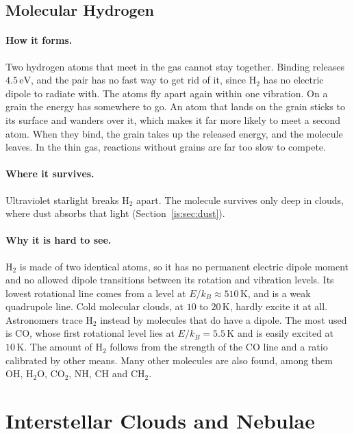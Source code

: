 \subsection{Molecular Hydrogen}
\label{is:sec:h2}

\paragraph{How it forms.} Two hydrogen atoms that meet in the gas cannot stay together. Binding releases $4.5\,\mathrm{eV}$, and the pair has no fast way to get rid of it, since $\mathrm{H_2}$ has no electric dipole to radiate with. The atoms fly apart again within one vibration. On a grain the energy has somewhere to go. An atom that lands on the grain sticks to its surface and wanders over it, which makes it far more likely to meet a second atom. When they bind, the grain takes up the released energy, and the molecule leaves. In the thin gas, reactions without grains are far too slow to compete.

\paragraph{Where it survives.} Ultraviolet starlight breaks $\mathrm{H_2}$ apart. The molecule survives only deep in clouds, where dust absorbs that light (Section~\ref{is:sec:dust}).

\paragraph{Why it is hard to see.} $\mathrm{H_2}$ is made of two identical atoms, so it has no permanent electric dipole moment and no allowed dipole transitions between its rotation and vibration levels. Its lowest rotational line comes from a level at $E/k_B\approx510\,\mathrm K$, and is a weak quadrupole line. Cold molecular clouds, at $10$ to $20\,\mathrm K$, hardly excite it at all. Astronomers trace $\mathrm{H_2}$ instead by molecules that do have a dipole. The most used is CO, whose first rotational level lies at $E/k_B=5.5\,\mathrm K$ and is easily excited at $10\,\mathrm K$. The amount of $\mathrm{H_2}$ follows from the strength of the CO line and a ratio calibrated by other means. Many other molecules are also found, among them OH, $\mathrm{H_2O}$, $\mathrm{CO_2}$, NH, CH and $\mathrm{CH_2}$.

\section{Interstellar Clouds and Nebulae}
\label{is:sec:clouds}

